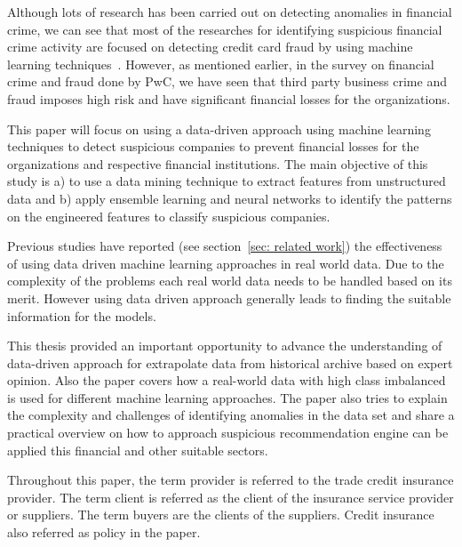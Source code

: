 Although lots of research has been carried out on detecting anomalies in financial crime, we can see that most of the researches for identifying suspicious financial crime activity are focused on detecting credit card fraud by using machine learning techniques~\cite{RB2021}.  However, as mentioned earlier, in the survey on financial crime and fraud done by PwC, we have seen that third party business crime and fraud imposes high risk and have significant financial losses for the organizations.



This paper will focus on using a data-driven approach using machine learning techniques to detect suspicious companies to prevent financial losses for the organizations and respective financial institutions. The main objective of this study is a) to use a data mining technique to extract features from unstructured data and b) apply ensemble learning and neural networks to identify the patterns on the engineered features to classify suspicious companies. 



Previous studies have reported (see section~\ref{sec: related work}) the effectiveness of using data driven machine learning approaches in real world data. Due to the complexity of the problems each real world data needs to be handled based on its merit. However using data driven approach generally leads to finding the suitable information for the models. 







This thesis provided an important opportunity to advance the understanding of data-driven approach for extrapolate data from historical archive based on expert opinion. Also the paper covers how a real-world data with high class imbalanced is used for different machine learning approaches. The paper also tries to explain the complexity and challenges of identifying anomalies in the data set and share a practical overview on how to approach suspicious recommendation engine can be applied this financial and other suitable sectors.





Throughout this paper, the term provider is referred to the trade credit insurance provider. The term client is referred as the client of the insurance service provider or suppliers. The term buyers are the clients of the suppliers. Credit insurance also referred as policy in the paper. 

